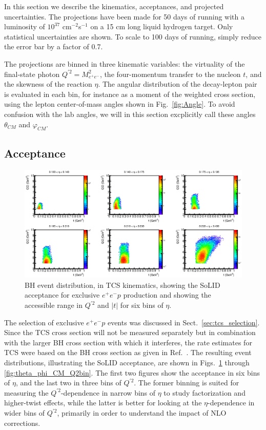 In this section we describe the kinematics, acceptances, and projected
uncertainties. The projections have been made for 50 days of running with a
luminosity of $10^{37}$ cm$^{-2}$s$^{-1}$ on a 15 cm long liquid hydrogen
target. Only statistical uncertainties are shown. To scale to 100 days of
running, simply reduce the error bar by a factor of 0.7.

The projections are binned in three  kinematic variables: the virtuality
of the final-state photon $Q^{\prime 2} = M_{e^+e^-}^2$, the four-momentum
transfer to the nucleon $t$, and the skewness of the reaction $\eta$. The
angular distribution of the decay-lepton pair is evaluated in each bin, for
instance as a moment of the weighted cross section, using the lepton
center-of-mass angles shown in Fig.~\ref{fig:Angle}. To avoid confusion with
the lab angles, we will in this section excplicitly call these angles
$\theta_{CM}$ and $\varphi_{CM}$.


\subsection{Acceptance}
\label{sec:acc}

\begin{figure}[t]
\includegraphics[scale=0.8]{t_Q2_etabin.eps}
\caption{\small{BH event distribution, in TCS kinematics, showing the SoLID
acceptance for exclusive $e^+e^-p$ production and showing the accessible
range in $Q^{\prime 2}$ and $|t|$ for six bins of $\eta$.}}
\label{fig:t_Q2_etabin}
\end{figure}

The selection of exclusive $e^+e^-p$ events was discussed in
Sect.~\ref{sec:tcs_selection}. Since the TCS cross section will not be
measured separately but in combination with the larger BH cross section with
which it interferes, the rate estimates for TCS were based on the BH cross
section as given in Ref.~\cite{vadim}. The resulting event distributions, 
illustrating the SoLID acceptance, are shown in Figs.~\ref{fig:t_Q2_etabin}
through \ref{fig:theta_phi_CM_Q2bin}. The first two figures show the
acceptance in six bins of $\eta$, and the last two in three bins of
$Q^{\prime 2}$. The former binning is suited for measuring the
$Q^{\prime 2}$-dependence in narrow bins of $\eta$ to study factorization
and higher-twist effects, while the latter is better for looking at the
$\eta$-dependence in wider bins of $Q^{\prime 2}$, primarily in order to
understand the impact of NLO corrections.

